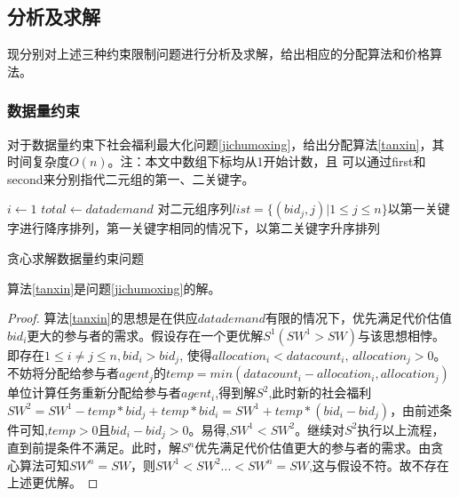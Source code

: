 \documentclass[promaster]{thesis-uestc}
\begin{document}
\FloatBarrier

\subsection{分析及求解}
现分别对上述三种约束限制问题进行分析及求解，给出相应的分配算法和价格算法。

\subsubsection{数据量约束}

对于数据量约束下社会福利最大化问题\ref{jichumoxing}，给出分配算法\ref{tanxin}，其时间复杂度$O(n)$。注：本文中数组下标均从1开始计数，且
可以通过first和second来分别指代二元组的第一、二关键字。

\begin{algorithm}[h] 
    $i \leftarrow 1$\;
    $total \leftarrow datademand $\;
    对二元组序列$list = \{(bid_j,j)|1 \leq j \leq n\}$以第一关键字进行降序排列，第一关键字相同的情况下，以第二关键字升序排列\;
\caption{贪心求解数据量约束问题}
\label{tanxin}
\end{algorithm}

\begin{theorem}
算法\ref{tanxin}是问题\ref{jichumoxing}的解。
\end{theorem}

\begin{proof}
    算法\ref{tanxin}的思想是在供应$datademand$有限的情况下，优先满足代价估值$bid_i$更大的参与者的需求。假设存在一个更优解$S^1(SW^1 > SW)$与该思想相悖。即存在$1 \leq i \neq j \leq n,bid_i > bid_j$, 使得$allocation_i < datacount_i \text{, } allocation_j > 0$。不妨将分配给参与者$agent_j$的$temp = min(datacount_i - allocation_i,allocation_j)$单位计算任务重新分配给参与者$agent_i$,得到解$S^2$,此时新的社会福利$SW^2= SW^1- temp*bid_j + temp*bid_i=SW^1+temp*(bid_i-bid_j)$，由前述条件可知,$temp > 0$且$bid_i - bid_j > 0$。易得,$SW^1<SW^2 $。继续对$S^2$执行以上流程，直到前提条件不满足。此时，解$S^n$优先满足代价估值更大的参与者的需求。由贪心算法可知$SW^n = SW$，则$SW^1<SW^2...<SW^n=SW$,这与假设不符。故不存在上述更优解。
\end{proof}
\end{document}
